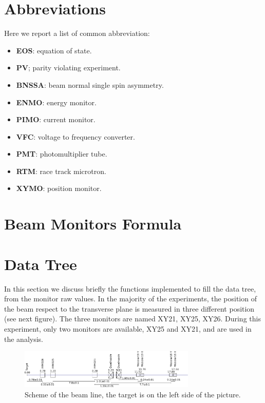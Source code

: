 \begin{appendices}

\section{Abbreviations}

Here we report a list of common abbreviation:

\begin{itemize}
\item \textbf{EOS}: equation of state.
\item \textbf{PV}; parity violating experiment.
\item \textbf{BNSSA}: beam normal single spin asymmetry.
\item \textbf{ENMO}: energy monitor.
\item \textbf{PIMO}: current monitor.
\item \textbf{VFC}: voltage to frequency converter.
\item \textbf{PMT}: photomultiplier tube.
\item \textbf{RTM}: race track microtron.
\item \textbf{XYMO}: position monitor.
\end{itemize} 

\section{Beam Monitors Formula}

\section{Data Tree}

In this section we discuss briefly the functions implemented to fill the data tree, from the monitor raw values. In the majority of the \transv experiments, the position of the beam respect to the transverse plane is measured in three different position (see next figure). The three monitors are named XY21, XY25, XY26. During this experiment, only two monitors are available, XY25 and XY21, and are used in the analysis. 

\begin{figure}[hbtp]
\centering
\includegraphics[width = 0.75\textwidth]{figures/XYMOCalibBeamLine.pdf}
\caption{Scheme of the beam line, the target is on the left side of the picture.}
\end{figure}


\end{appendices}
